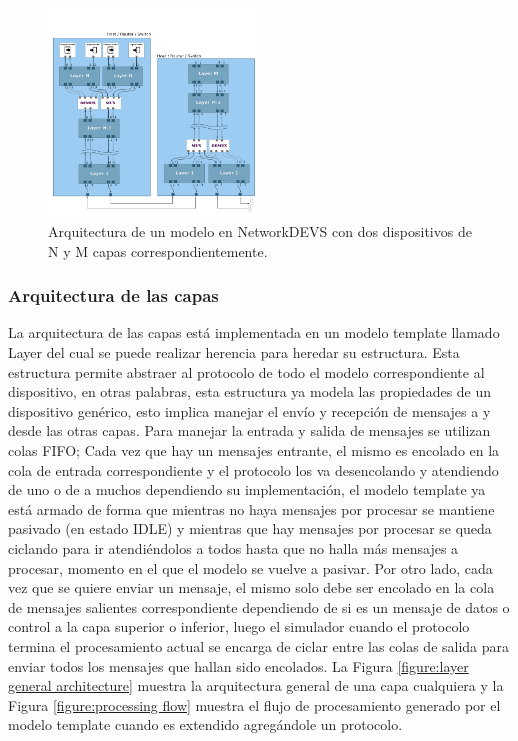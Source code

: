\documentclass[10pt,a4paper]{article}
\begin{document}
\begin{figure}[htbp]
    \centering
    \includegraphics[width = 0.5\textwidth]{img/png/general_architecture.png}
    \caption{Arquitectura de un modelo en NetworkDEVS con dos dispositivos de N y M capas correspondientemente.}
    \label{figure:general architecture}
\end{figure}

\newpage

\subsubsection{Arquitectura de las capas}

La arquitectura de las capas está implementada en un modelo template llamado Layer del cual se puede realizar herencia para heredar su estructura. Esta estructura permite abstraer al protocolo de todo el modelo correspondiente al dispositivo, en otras palabras, esta estructura ya modela las propiedades de un dispositivo genérico, esto implica manejar el envío y recepción de mensajes a y desde las otras capas. Para manejar la entrada y salida de mensajes se utilizan colas FIFO; Cada vez que hay un mensajes entrante, el mismo es encolado en la cola de entrada correspondiente y el protocolo los va desencolando y atendiendo de uno o de a muchos dependiendo su implementación, el modelo template ya está armado de forma que mientras no haya mensajes por procesar se mantiene pasivado (en estado IDLE) y mientras que hay mensajes por procesar se queda ciclando para ir atendiéndolos a todos hasta que no halla más mensajes a procesar, momento en el que el modelo se vuelve a pasivar. Por otro lado, cada vez que se quiere enviar un mensaje, el mismo solo debe ser encolado en la cola de mensajes salientes correspondiente dependiendo de si es un mensaje de datos o control a la capa superior o inferior, luego el simulador cuando el protocolo termina el procesamiento actual se encarga de ciclar entre las colas de salida para enviar todos los mensajes que hallan sido encolados. La Figura \ref{figure:layer general architecture} muestra la arquitectura general de una capa cualquiera y la Figura \ref{figure:processing flow} muestra el flujo de procesamiento generado por el modelo template cuando es extendido agregándole un protocolo.
\end{document}
